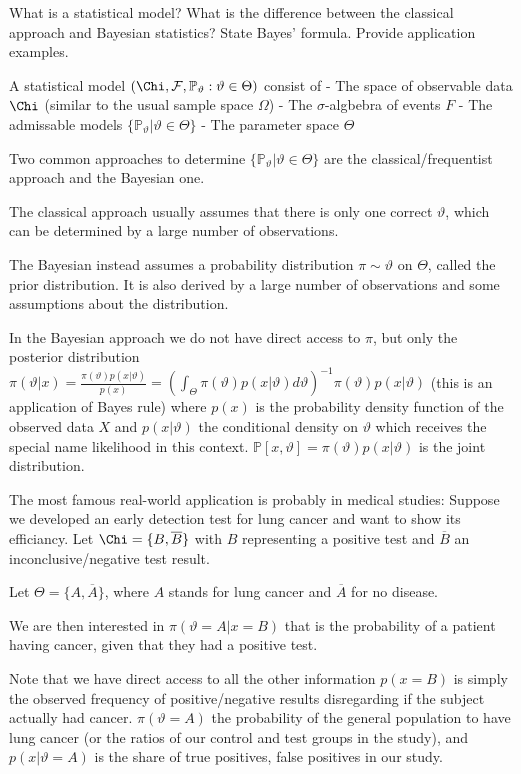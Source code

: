 What is a statistical model? What is the difference between the classical approach
and Bayesian statistics? State Bayes’ formula. Provide application examples.

A statistical model \( (\Chi , \mathcal{F}, \mathbb{P}_\vartheta : \vartheta \in \Theta) \) consist of
- The space of observable data \( \Chi \) (similar to the usual sample space \( \Omega \))
- The \( \sigma \)-algbebra of events \( F \)
- The admissable models \( \{\mathbb{P}_\vartheta | \vartheta \in \Theta \} \) 
- The parameter space \( \Theta \)


Two common approaches to determine \( \{\mathbb{P}_\vartheta | \vartheta \in \Theta \} \)
are the classical/frequentist approach and the Bayesian one.

The classical approach usually assumes that there is only one correct \( \vartheta \),
which can be determined by a large number of observations.

The Bayesian instead assumes a probability distribution \( \pi \sim \vartheta \) on \( \Theta \),
called the prior distribution.
It is also derived by a large number of observations and some assumptions about the distribution.

In the Bayesian approach we do not have direct access to \( \pi \), but only the posterior distribution
\( \pi(\vartheta|x) = \frac{\pi(\vartheta)p(x|\vartheta)}{p(x)} = (\int_{\Theta} \pi(\vartheta)p(x|\vartheta) d\vartheta)^{-1} \pi(\vartheta)p(x|\vartheta) \)
(this is an application of Bayes rule)
where \( p(x) \) is the probability density function of the observed data \( X \) and \( p(x|\vartheta) \) the conditional density on \( \vartheta \)
which receives the special name likelihood in this context.
\( \mathbb{P}[x, \vartheta] = \pi(\vartheta)p(x|\vartheta) \) is the joint distribution.

The most famous real-world application is probably in medical studies:
Suppose we developed an early detection test for lung cancer and want
to show its efficiancy. 
Let \( \Chi = \{B, \overline{B}\} \) with \( B \) representing a positive test
and \( \overline{B} \) an inconclusive/negative test result.

Let \( \Theta = \{A, \overline{A}\} \), where \( A \)
stands for lung cancer and \( \overline{A} \) for no disease.

We are then interested in \( \pi(\vartheta = A|x = B) \) that is the probability
of a patient having cancer, given that they had a positive test.

Note that we have direct access to all the other information \( p(x = B) \)
is simply the observed frequency of positive/negative results disregarding if the subject actually had cancer.
\( \pi(\vartheta = A) \) the probability of the general population to have lung cancer 
(or the ratios of our control and test groups in the study),  
and \( p(x|\vartheta = A) \) is the share of true positives, false positives in our study.

